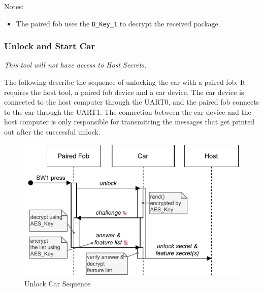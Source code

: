 \documentclass[11pt,oneside,onecolumn,letterpaper]{article}
\begin{document}
Notes:
\begin{itemize}
	\item The paired fob uses the \verb|D_Key_1| to decrypt the received package.
\end{itemize}

\subsubsection{Unlock and Start Car}

\textit{This tool will not have access to Host Secrets.}

The following describe the sequence of unlocking the car with a paired fob. It requires the host tool, a paired fob device and a car device. The car device is connected to the host computer through the UART0, and the paired fob connects to the car through the UART1. The connection between the car device and the host computer is only responsible for transmitting the messages that get printed out after the successful unlock.

\begin{figure}[!htbp]
	\begin{centering}
		\includegraphics[width = .6\textwidth]{pic/unlock.pdf}
		\caption{Unlock Car Sequence}
		\label{fig:unlock}
	\end{centering}
\end{figure}
\end{document}

